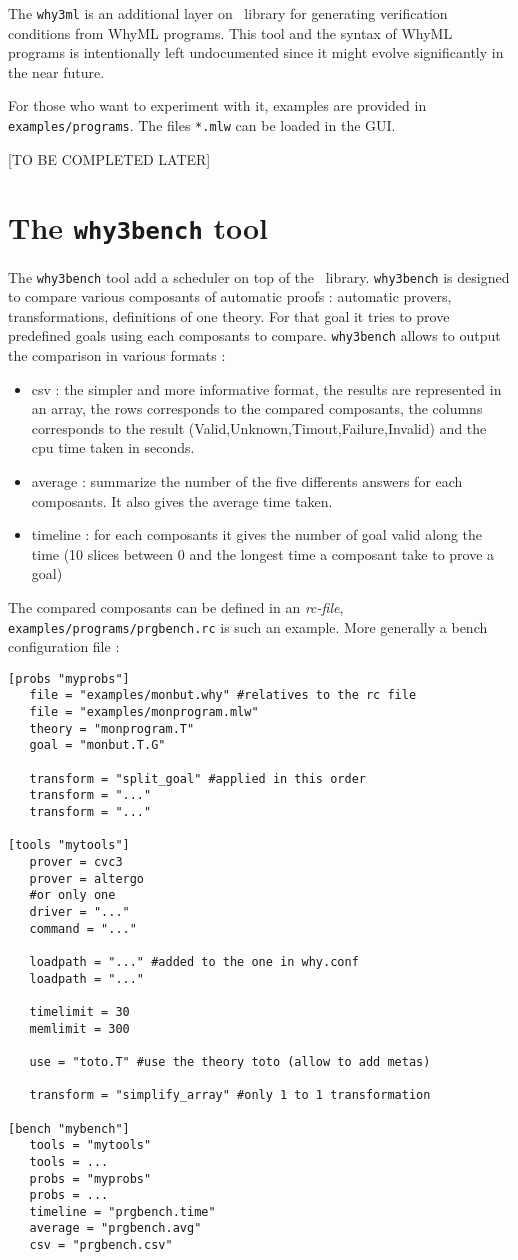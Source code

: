 The \texttt{why3ml} is an additional layer on \why\ library for
generating verification conditions from WhyML programs. This tool and
the syntax of WhyML programs is intentionally left undocumented since
it might evolve significantly in the near future.

For those who want to experiment with it, examples are provided in
\texttt{examples/programs}. The files \texttt{*.mlw} can be loaded in
the GUI.

[TO BE COMPLETED LATER]

\section{The \texttt{why3bench} tool}
The \texttt{why3bench} tool add a scheduler on top of the \why\
library. \texttt{why3bench} is designed to compare various composants
of automatic proofs : automatic provers, transformations, definitions
of one theory. For that goal it tries to prove predefined goals using
each composants to compare. \texttt{why3bench} allows to output the
comparison in various formats :
\begin{itemize}
\item csv : the simpler and more informative format, the results are
  represented in an array, the rows corresponds to the
  compared composants, the columns corresponds to the result
  (Valid,Unknown,Timout,Failure,Invalid) and the cpu time taken in seconds.
\item average : summarize the number of the five differents answers
  for each composants. It also gives the average time taken.
\item timeline : for each composants it gives the number of goal valid
  along the time (10 slices between 0 and the longest time a composant
  take to prove a goal)
\end{itemize}

The compared composants can be defined in an \emph{rc-file},
\texttt{examples/programs/prgbench.rc} is such an example. More
generally a bench configuration file  :
\begin{verbatim}
[probs "myprobs"]
   file = "examples/monbut.why" #relatives to the rc file
   file = "examples/monprogram.mlw"
   theory = "monprogram.T"
   goal = "monbut.T.G"

   transform = "split_goal" #applied in this order
   transform = "..."
   transform = "..."

[tools "mytools"]
   prover = cvc3
   prover = altergo
   #or only one
   driver = "..."
   command = "..."

   loadpath = "..." #added to the one in why.conf
   loadpath = "..."

   timelimit = 30
   memlimit = 300

   use = "toto.T" #use the theory toto (allow to add metas)

   transform = "simplify_array" #only 1 to 1 transformation

[bench "mybench"]
   tools = "mytools"
   tools = ...
   probs = "myprobs"
   probs = ...
   timeline = "prgbench.time"
   average = "prgbench.avg"
   csv = "prgbench.csv"
\end{verbatim}

